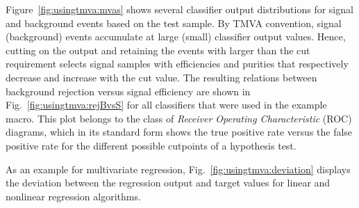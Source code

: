 Figure~\ref{fig:usingtmva:mvas} shows several classifier output 
distributions for signal and background events based on the test sample. 
By TMVA convention, signal (background) events accumulate at large 
(small) classifier output values. Hence, cutting on the output and retaining
the events with \yMVA larger than the cut requirement selects signal samples
with efficiencies and purities that respectively decrease and increase with 
the cut value. The resulting relations between background rejection versus 
signal efficiency are shown in Fig.~\ref{fig:usingtmva:rejBvsS} for all 
classifiers that were used in the example macro. This plot belongs to the 
class of {\em Receiver Operating Characteristic} (ROC) diagrams,
which in its standard form shows the true positive rate versus the false 
positive rate for the different possible cutpoints of a hypothesis test.

As an example for multivariate regression, Fig.~\ref{fig:usingtmva:deviation} displays
the deviation between the regression output and target values for linear and 
nonlinear regression algorithms. 

